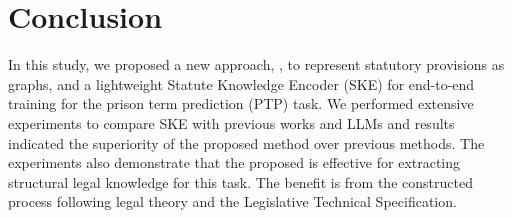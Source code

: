 \section{Conclusion}
In this study, we proposed a new approach, \lawgraph{}, to represent statutory provisions as graphs, and a lightweight Statute Knowledge Encoder (SKE) for end-to-end training for the prison term prediction (PTP) task. We performed extensive experiments to compare SKE with previous works and LLMs and results indicated the superiority of the proposed method over previous methods. The experiments also demonstrate that the proposed \lawgraph{} is effective for extracting structural legal knowledge for this task. The benefit is from the \lawgraph{} constructed process following legal theory and the Legislative Technical Specification.
